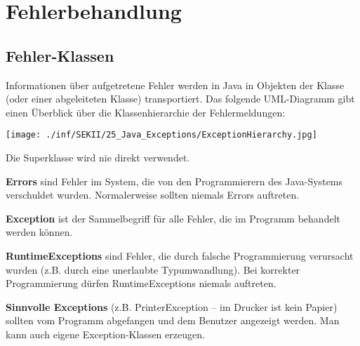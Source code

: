 \chapter{Fehlerbehandlung}
\renewcommand{\chaptertitle}{Fehlerbehandlung}

\lehead[]{\sf\hspace*{-2.00cm}\textcolor{white}{\colorbox{lightblue}{\makebox[1.60cm][r]{\thechapter}}}\hspace{0.17cm}\textcolor{lightblue}{\chaptertitle}}
\rohead[]{\textcolor{lightblue}{\chaptertitle}\sf\hspace*{0.17cm}\textcolor{white}{\colorbox{lightblue}{\makebox[1.60cm][l]{\thechapter}}}\hspace{-2.00cm}}
\rehead[]{\textcolor{lightblue}{AvHG, Inf, My}}
\lohead[]{\textcolor{lightblue}{AvHG, Inf, My}}

\lstset{style=myJava}

\section{Fehler-Klassen}

Informationen über aufgetretene Fehler werden in Java in Objekten der Klasse
 (oder einer abgeleiteten Klasse) transportiert. Das folgende
UML-Diagramm gibt einen Überblick über die Klassenhierarchie der Fehlermeldungen:

\begin{center}
\texttt{[image: ./inf/SEKII/25\_Java\_Exceptions/ExceptionHierarchy.jpg]}
\end{center}

\begin{compactitem}
\item Die Superklasse \textbf{} wird nie direkt verwendet.
\item \textbf{Errors} sind Fehler im System, die von den Programmierern des
Java-Systems verschuldet wurden. Normalerweise sollten niemals Errors auftreten.
\item \textbf{Exception} ist der Sammelbegriff für alle Fehler, die im Programm
behandelt werden können.
\item \textbf{RuntimeExceptions} sind Fehler, die durch falsche Programmierung
verursacht wurden (z.B. durch eine unerlaubte Typumwandlung). Bei korrekter
Programmierung dürfen RuntimeExceptions niemals auftreten.
\item \textbf{Sinnvolle Exceptions} (z.B. PrinterException – \glqq im Drucker
ist kein Papier\grqq ) sollten vom Programm abgefangen und dem Benutzer
angezeigt werden. Man kann auch eigene Exception-Klassen erzeugen.
\end{compactitem}


